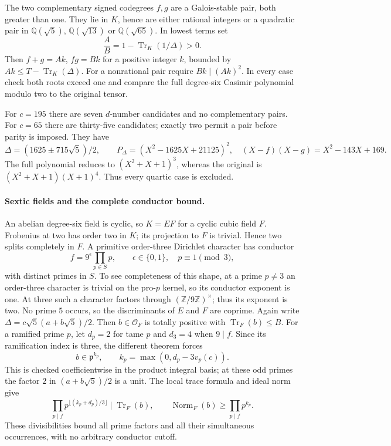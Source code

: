 The two complementary signed codegrees $f,g$ are a Galois-stable pair,
both greater than one. They lie in $K$, hence are either rational integers
or a quadratic pair in $\mathbb Q(\sqrt5)$, $\mathbb Q(\sqrt{13})$ or
$\mathbb Q(\sqrt{65})$. In lowest terms set
\[
 \frac AB=1-\operatorname{Tr}_K(1/\Delta)>0.
\]
Then $f+g=Ak$, $fg=Bk$ for a positive integer $k$, bounded by
$Ak\le T-\operatorname{Tr}_K(\Delta)$. For a nonrational pair require
$Bk\mid(Ak)^2$. In every case check both roots exceed one and compare
the full degree-six Casimir polynomial modulo two to the original tensor.

For $c=195$ there are seven $d$-number candidates and no complementary
pairs. For $c=65$ there are thirty-five candidates; exactly two permit a
pair before parity is imposed. They have
\[
 \Delta=(1625\pm715\sqrt5)/2,\qquad
 P_\Delta=(X^2-1625X+21125)^2,\quad
 (X-f)(X-g)=X^2-143X+169.
\]
The full polynomial reduces to $(X^2+X+1)^3$, whereas the original is
$(X^2+X+1)(X+1)^4$. Thus every quartic case is excluded.

\paragraph{Sextic fields and the complete conductor bound.}
An abelian degree-six field is cyclic, so $K=E F$ for a cyclic cubic field
$F$. Frobenius at two has order two in $K$; its projection to $F$ is
trivial. Hence two splits completely in $F$.
A primitive order-three Dirichlet character has conductor
\[
 f=9^\epsilon\prod_{p\in S}p,\qquad \epsilon\in\{0,1\},\quad
 p\equiv1\pmod3,
\]
with distinct primes in $S$. To see completeness of this shape, at a prime
$p\ne3$ an order-three character is trivial on the pro-$p$ kernel, so its
conductor exponent is one. At three such a character factors through
$(\mathbb Z/9\mathbb Z)^\times$; thus its exponent is two. No prime $5$
occurs, so the discriminants of $E$ and $F$ are coprime.
Again write $\Delta=c\sqrt5(a+b\sqrt5)/2$. Then $b\in\mathcal O_F$ is
totally positive with $\operatorname{Tr}_F(b)\le B$.
For a ramified prime $p$, let $d_p=2$ for tame $p$ and $d_3=4$ when
$9\mid f$. Since its ramification index is three, the different theorem
forces
\[
 b\in\mathfrak p^{k_p},\qquad k_p=\max(0,d_p-3v_p(c)).
\]
This is checked coefficientwise in the product integral basis; at these
odd primes the factor $2$ in $(a+b\sqrt5)/2$ is a unit. The local trace
formula and ideal norm give
\[
 \prod_{p\mid f}p^{\lfloor(k_p+d_p)/3\rfloor}
     \mid\operatorname{Tr}_F(b),\qquad
 \operatorname{Norm}_F(b)\ge\prod_{p\mid f}p^{k_p}.
\]
These divisibilities bound all prime factors and all their simultaneous
occurrences, with no arbitrary conductor cutoff.

